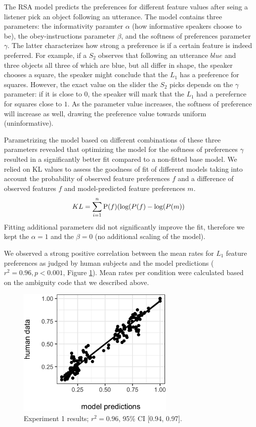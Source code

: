 \documentclass[10pt,a4paper]{article}
\begin{document}
The RSA model predicts the preferences for different feature values after seing a listener pick an object following an utterance. The model contains three parameters: the informativity paramter $\alpha$ (how informative speakers choose to be), the obey-instructions parameter $\beta$, and the softness of preferences parameter $\gamma$. The latter characterizes how strong a preference is if a certain feature is indeed preferred. For example, if a $S_2$ observes that following an utterance $blue$ and three objects all three of which are blue, but all differ in shape, the speaker chooses a square, the speaker might conclude that the $L_1$  has a preference for squares. However, the exact value on the slider the $S_2$ picks depends on the $\gamma$ parameter: if it is close to $0$, the speaker will mark that the $L_1$ had a perefernce for squares close to $1$. As the parameter value increases, the softness of preference will increase as well, drawing the preference value towards  uniform (uninformative).

Parametrizing the model based on different combinations of these three parameters revealed that optimizing the model for the softness of preferences $\gamma$ resulted in a significantly better fit compared to a non-fitted base model. We relied on KL values to assess the goodness of fit of different models taking into account the probability of observed feature preferences $f$ and a difference of observed features $f$ and model-predicted feature preferences $m$.  
$$KL = \sum_{i=1}^{n}\textrm P(f) (\textrm {log} (P(f) - \textrm {log} (P(m)) $$
Fitting additional parameters did not significantly improve the fit, therefore we kept the $\alpha = 1 $ and the $\beta = 0$ (no additional scaling of the model). 

We observed a strong positive correlation between the mean rates for $L_1$ feature preferences as judged by human subjects and the model predictions ($r^2 = 0.96, p < 0.001$, Figure \ref{exp1-results}). Mean rates per condition were calculated based on the ambiguity code that we described above. 

\begin{figure}[ht]
	\centering
	\includegraphics[width=3in]{images/X4-scatter-CogSci.eps}
	\caption{Experiment 1 results; $r^{2}=0.96$, 95\% CI [0.94, 0.97].}\label{exp1-results}
\end{figure}
\end{document}

